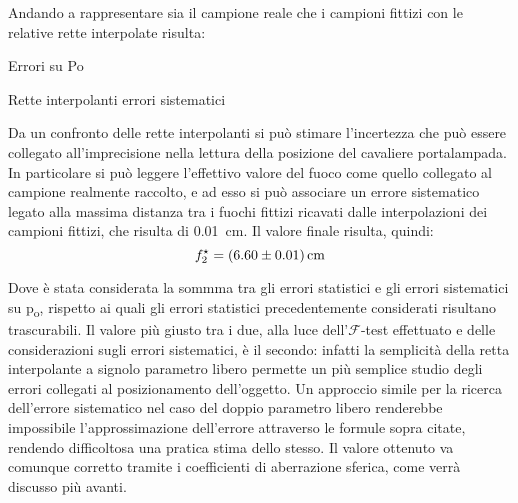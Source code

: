 Andando a rappresentare sia il campione reale che i campioni fittizi con le relative rette interpolate risulta:
\begin{grafico} \centering  \caption{Errori su Po} \label{gr:02_graph_4.tex} \end{grafico}
\begin{tabella}
	\centering
	
	\caption{Rette interpolanti errori sistematici}
	\label{tab:02tab6}
\end{tabella}
Da un confronto delle rette interpolanti si può stimare l'incertezza che può essere collegato all'imprecisione nella lettura della
 posizione del cavaliere portalampada. In particolare si può leggere l'effettivo valore del fuoco come quello collegato al
 campione realmente raccolto, e ad esso si può associare un errore sistematico legato alla massima distanza tra i fuochi fittizi
 ricavati dalle interpolazioni dei campioni fittizi, che risulta di 0.01~cm. Il valore finale risulta, quindi:
\[f^{\star}_2 = (6.60 \pm 0.01) \,\mathrm{cm}\]

Dove è stata considerata la sommma tra gli errori statistici e gli errori sistematici su p\textsubscript{o}, rispetto ai quali gli
 errori statistici precedentemente considerati risultano trascurabili.
 Il valore più giusto tra i due, alla luce dell'$\mathcal{F}$-test effettuato e delle considerazioni sugli errori sistematici, è il secondo:
 infatti la semplicità della retta interpolante a signolo parametro libero permette un più semplice studio degli errori collegati
 al posizionamento dell'oggetto. Un approccio simile per la ricerca dell'errore sistematico nel caso del doppio parametro libero
 renderebbe impossibile l'approssimazione dell'errore attraverso le formule sopra citate, rendendo difficoltosa una pratica stima
 dello stesso. Il valore ottenuto va comunque corretto tramite i coefficienti di aberrazione sferica, come verrà discusso più avanti.
